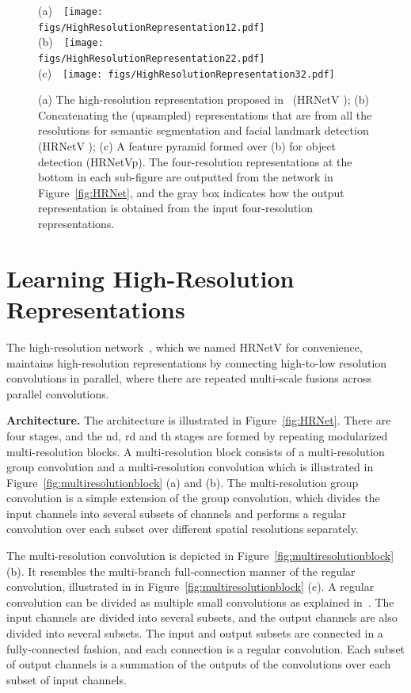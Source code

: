 \documentclass[10pt,twocolumn,letterpaper]{article}
\begin{document}
\begin{figure*}[t]
\footnotesize
    \centering
    (a)~~\texttt{[image: figs/HighResolutionRepresentation12.pdf]}~~~~~~~~~~
    (b)~~\texttt{[image: figs/HighResolutionRepresentation22.pdf]}~~~~~~~~~~
    (c)~~\texttt{[image: figs/HighResolutionRepresentation32.pdf]}
    \caption{
    (a) The high-resolution representation proposed in~\cite{SunXLW19} (HRNetV );
    (b) Concatenating the (upsampled) representations
    that are from all the resolutions
    for semantic segmentation and facial landmark detection (HRNetV );
    (c) A feature pyramid formed over (b)
    for object detection (HRNetVp).
    The four-resolution representations at the bottom in each sub-figure are outputted from the network in Figure~\ref{fig:HRNet},
    and the gray box indicates how the output representation is obtained from the input four-resolution representations.}
    \label{fig:highresolutionhead}
    \vspace{-3mm}
\end{figure*}

\section{Learning High-Resolution Representations}
\label{sec:HRNetV1}
The high-resolution network~\cite{SunXLW19}, which we named HRNetV
for convenience,
maintains high-resolution representations
by connecting high-to-low resolution convolutions in parallel,
where there are repeated multi-scale fusions across parallel convolutions.

\vspace{.1cm}
\noindent\textbf{Architecture.}
The architecture is illustrated in Figure~\ref{fig:HRNet}.
There are four stages,
and the nd, rd and th stages are formed
by repeating modularized multi-resolution blocks.
A multi-resolution block
consists of a multi-resolution group convolution
and a multi-resolution convolution
which is illustrated in Figure~\ref{fig:multiresolutionblock} (a) and (b).
The multi-resolution group convolution is a simple extension
of the group convolution, which divides the input channels
into several subsets of channels
and performs a regular convolution
over each subset
over different spatial resolutions separately.

The multi-resolution convolution is depicted
in Figure~\ref{fig:multiresolutionblock} (b).
It resembles the multi-branch full-connection manner
of the regular convolution, illustrated in in Figure~\ref{fig:multiresolutionblock} (c).
A regular convolution
can be divided as multiple small convolutions
as explained in~\cite{ZhangQ0W17}.
The input channels are divided into several subsets,
and the output channels are also divided into several subsets.
The input and output subsets are connected
in a fully-connected fashion,
and each connection is a regular convolution.
Each subset of output channels
is a summation of the outputs of the convolutions
over each subset of input channels.
\end{document}
